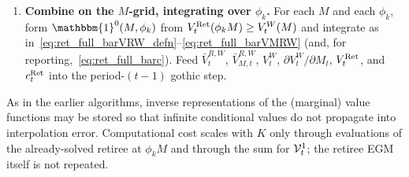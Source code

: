 \begin{enumerate}
\begin{align}
		\\
		M_t(A_i)
		&= c_t^{W}(A_i)+A_i.
	\end{align}
	Interpolate $c_t^{W}$ and $V_t^{W}$ onto the common $M$-grid. If there is not enough smoothness, apply an upper-envelope refinement as in the algorithm of Section~\ref{sec:RetirementModel}.
	\item \textbf{Combine on the $M$-grid, integrating over $\phi_k$.} For each $M$ and each $\phi_k$, form $\mathbbm{1}^{0}(M,\phi_k)$ from $V_t^{\mathrm{Ret}}(\phi_k M)\ge V_t^{W}(M)$ and integrate as in~\eqref{eq:ret_full_barVRW_defn}--\eqref{eq:ret_full_barVMRW} (and, for reporting,~\eqref{eq:ret_full_barc}). Feed $\bar V_t^{R,W}$, $\bar V_{M,t}^{R,W}$, $V_t^{W}$, $\partial V_t^{W}/\partial M_t$, $V_t^{\mathrm{Ret}}$, and $c_t^{\mathrm{Ret}}$ into the period-$(t-1)$ gothic step.
\end{enumerate}
As in the earlier algorithms, inverse representations of the (marginal) value functions may be stored so that infinite conditional values do not propagate into interpolation error. Computational cost scales with $K$ only through evaluations of the already-solved retiree at $\phi_k M$ and through the sum for $\mathcal{V}_t^{1}$; the retiree EGM itself is not repeated.
